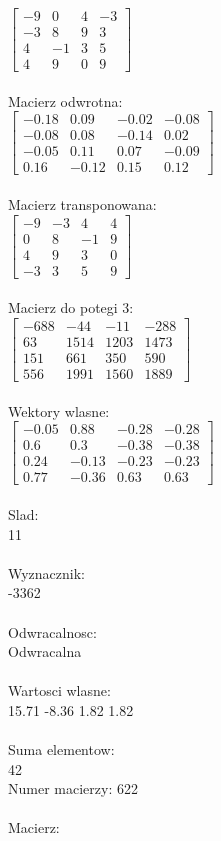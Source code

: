 \documentclass[a4paper,12pt]{article}
\begin{document}
$\begin{bmatrix} -9&0&4&-3\\-3&8&9&3\\4&-1&3&5\\4&9&0&9 \end{bmatrix}$
\\
\\
Macierz odwrotna:\\

$\begin{bmatrix} -0.18&0.09&-0.02&-0.08\\-0.08&0.08&-0.14&0.02\\-0.05&0.11&0.07&-0.09\\0.16&-0.12&0.15&0.12 \end{bmatrix}$
\\
\\
Macierz transponowana:\\

$\begin{bmatrix} -9&-3&4&4\\0&8&-1&9\\4&9&3&0\\-3&3&5&9 \end{bmatrix}$
\\
\\
Macierz do potegi 3:\\

$\begin{bmatrix} -688&-44&-11&-288\\63&1514&1203&1473\\151&661&350&590\\556&1991&1560&1889 \end{bmatrix}$
\\
\\
Wektory wlasne:\\

$\begin{bmatrix} -0.05&0.88&-0.28&-0.28\\0.6&0.3&-0.38&-0.38\\0.24&-0.13&-0.23&-0.23\\0.77&-0.36&0.63&0.63 \end{bmatrix}$
\\
\\
Slad:\\
11
\\
\\
Wyznacznik:\\
-3362
\\
\\
Odwracalnosc:\\
Odwracalna
\\
\\
Wartosci wlasne:\\
15.71 -8.36 1.82 1.82
\\
\\
Suma elementow:\\
42
\\
\newpage
Numer macierzy:
622
\\
\\
Macierz:\\
\end{document}
